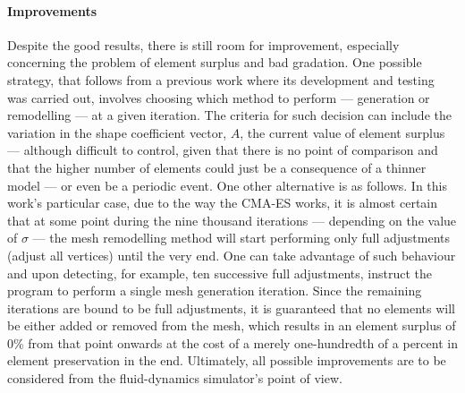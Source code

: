 



\paragraph{Improvements} Despite the good results, there is still room for improvement, especially concerning the problem of element surplus and bad gradation. One possible strategy, that follows from a previous work where its development and testing was carried out, involves choosing which method to perform --- generation or remodelling --- at a given iteration. The criteria for such decision can include the variation in the shape coefficient vector, $A$, the current value of element surplus --- although difficult to control, given that there is no point of comparison and that the higher number of elements could just be a consequence of a thinner model --- or even be a periodic event. One other alternative is as follows. In this work's particular case, due to the way the CMA-ES works, it is almost certain that at some point during the nine thousand iterations --- depending on the value of $\sigma$ --- the mesh remodelling method will start performing only full adjustments (adjust  all vertices) until the very end. One can take advantage of such behaviour and upon detecting, for example, ten successive full adjustments, instruct the program to perform a single mesh generation iteration. Since the remaining iterations are bound to be full adjustments, it is guaranteed that no elements will be either added or removed from the mesh, which results in an element surplus of 0\% from that point onwards at the cost of a merely one-hundredth of a percent in element preservation in the end. Ultimately, all possible improvements are to be considered from the fluid-dynamics simulator's point of view.